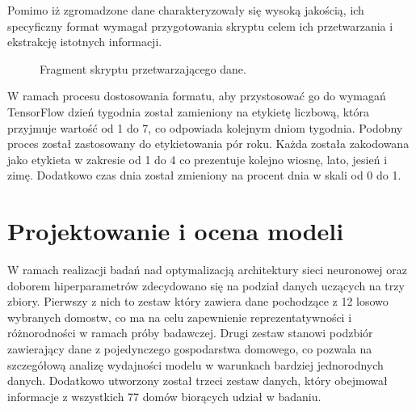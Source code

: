 \documentclass[a4paper,twoside,12pt]{book}
\begin{document}
Pomimo iż zgromadzone dane charakteryzowały się wysoką jakością, ich specyficzny format wymagał przygotowania skryptu celem ich przetwarzania i ekstrakcję istotnych informacji.\\
\begin{figure}[!h]
  \centering
  
  \caption{Fragment skryptu przetwarzającego dane.}
  \label{fig:pseudokod:listings}
\end{figure}

W ramach procesu dostosowania formatu, aby przystosować go do wymagań TensorFlow dzień tygodnia został zamieniony na etykietę liczbową, która przyjmuje wartość od 1 do 7, co odpowiada kolejnym dniom tygodnia. Podobny proces został zastosowany do etykietowania pór roku. Każda została zakodowana jako etykieta w zakresie od 1 do 4 co prezentuje kolejno wiosnę, lato, jesień i zimę. Dodatkowo czas dnia został zmieniony na procent dnia w skali od 0 do 1.
\section{Projektowanie i ocena modeli}
W ramach realizacji badań nad optymalizacją architektury sieci neuronowej oraz doborem hiperparametrów zdecydowano się na podział danych uczących na trzy zbiory. Pierwszy z nich to zestaw który zawiera dane pochodzące z 12 losowo wybranych domostw, co ma na celu zapewnienie reprezentatywności i różnorodności w ramach próby badawczej. Drugi zestaw stanowi podzbiór zawierający dane z pojedynczego gospodarstwa domowego, co pozwala na szczegółową analizę wydajności modelu w warunkach bardziej jednorodnych danych. Dodatkowo utworzony został trzeci zestaw danych, który obejmował informacje z wszystkich 77 domów biorących udział w badaniu.
\end{document}
